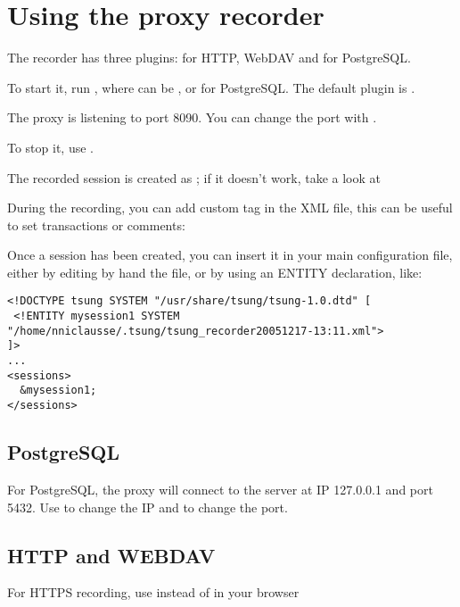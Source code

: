 \documentclass{TSUNG-en}
\begin{document}
\section{Using the proxy recorder}


The recorder has three plugins: for HTTP, WebDAV and for PostgreSQL.

To start it, run , where  can be
,  or   for PostgreSQL. The default plugin is .


The proxy is listening to port 8090. You can change the port with
.

To stop it, use .

The recorded session is created as
; if it doesn't work,
take a look at 

During the recording, you can add custom tag in the XML file, this can
be useful to set transactions or comments:

Once a session has been created, you can insert it in your main configuration
file, either by editing by hand the file, or by using an ENTITY
declaration, like:

\begin{Verbatim}
<!DOCTYPE tsung SYSTEM "/usr/share/tsung/tsung-1.0.dtd" [
 <!ENTITY mysession1 SYSTEM "/home/nniclausse/.tsung/tsung_recorder20051217-13:11.xml">
]>
...
<sessions>
  &mysession1;
</sessions>
\end{Verbatim}

\subsection{PostgreSQL}

For PostgreSQL, the proxy will connect to the server at IP 127.0.0.1
and port 5432. Use  to change the IP and
 to change the port.

\subsection{HTTP and WEBDAV}

For HTTPS recording, use  instead of
 in your browser
\end{document}
